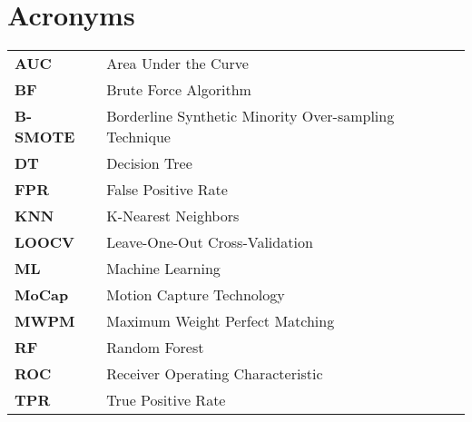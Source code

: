 \section*{\Huge Acronyms}

\begin{table}[H]
    \begin{tabular}{l l} 
        \textbf{AUC} & Area Under the Curve \\
        \textbf{BF} & Brute Force Algorithm \\
        \textbf{B-SMOTE} & Borderline Synthetic Minority Over-sampling Technique \\
        \textbf{DT} & Decision Tree \\
        \textbf{FPR} & False Positive Rate \\
        \textbf{KNN} & K-Nearest Neighbors \\
        \textbf{LOOCV} & Leave-One-Out Cross-Validation \\
        \textbf{ML} & Machine Learning \\
        \textbf{MoCap} & Motion Capture Technology \\
        \textbf{MWPM} & Maximum Weight Perfect Matching \\
        \textbf{RF} & Random Forest \\
        \textbf{ROC} & Receiver Operating Characteristic \\
        \textbf{TPR} & True Positive Rate \\
    \end{tabular}
\end{table}

